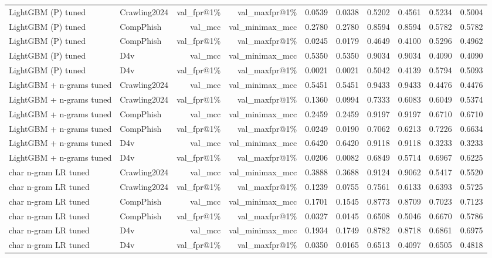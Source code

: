 \begin{table}[t]
\begin{tabular}{llrrrrrrrr}
LightGBM (P) tuned & Crawling2024 & val\_fpr@1\% & val\_maxfpr@1\% & 0.0539 & 0.0338 & 0.5202 & 0.4561 & 0.5234 & 0.5004 \\
LightGBM (P) tuned & CompPhish & val\_mcc & val\_minimax\_mcc & 0.2780 & 0.2780 & 0.8594 & 0.8594 & 0.5782 & 0.5782 \\
LightGBM (P) tuned & CompPhish & val\_fpr@1\% & val\_maxfpr@1\% & 0.0245 & 0.0179 & 0.4649 & 0.4100 & 0.5296 & 0.4962 \\
LightGBM (P) tuned & D4v & val\_mcc & val\_minimax\_mcc & 0.5350 & 0.5350 & 0.9034 & 0.9034 & 0.4090 & 0.4090 \\
LightGBM (P) tuned & D4v & val\_fpr@1\% & val\_maxfpr@1\% & 0.0021 & 0.0021 & 0.5042 & 0.4139 & 0.5794 & 0.5093 \\
LightGBM + n-grams tuned & Crawling2024 & val\_mcc & val\_minimax\_mcc & 0.5451 & 0.5451 & 0.9433 & 0.9433 & 0.4476 & 0.4476 \\
LightGBM + n-grams tuned & Crawling2024 & val\_fpr@1\% & val\_maxfpr@1\% & 0.1360 & 0.0994 & 0.7333 & 0.6083 & 0.6049 & 0.5374 \\
LightGBM + n-grams tuned & CompPhish & val\_mcc & val\_minimax\_mcc & 0.2459 & 0.2459 & 0.9197 & 0.9197 & 0.6710 & 0.6710 \\
LightGBM + n-grams tuned & CompPhish & val\_fpr@1\% & val\_maxfpr@1\% & 0.0249 & 0.0190 & 0.7062 & 0.6213 & 0.7226 & 0.6634 \\
LightGBM + n-grams tuned & D4v & val\_mcc & val\_minimax\_mcc & 0.6420 & 0.6420 & 0.9118 & 0.9118 & 0.3233 & 0.3233 \\
LightGBM + n-grams tuned & D4v & val\_fpr@1\% & val\_maxfpr@1\% & 0.0206 & 0.0082 & 0.6849 & 0.5714 & 0.6967 & 0.6225 \\
char n-gram LR tuned & Crawling2024 & val\_mcc & val\_minimax\_mcc & 0.3888 & 0.3688 & 0.9124 & 0.9062 & 0.5417 & 0.5520 \\
char n-gram LR tuned & Crawling2024 & val\_fpr@1\% & val\_maxfpr@1\% & 0.1239 & 0.0755 & 0.7561 & 0.6133 & 0.6393 & 0.5725 \\
char n-gram LR tuned & CompPhish & val\_mcc & val\_minimax\_mcc & 0.1701 & 0.1545 & 0.8773 & 0.8709 & 0.7023 & 0.7123 \\
char n-gram LR tuned & CompPhish & val\_fpr@1\% & val\_maxfpr@1\% & 0.0327 & 0.0145 & 0.6508 & 0.5046 & 0.6670 & 0.5786 \\
char n-gram LR tuned & D4v & val\_mcc & val\_minimax\_mcc & 0.1934 & 0.1749 & 0.8782 & 0.8718 & 0.6861 & 0.6975 \\
char n-gram LR tuned & D4v & val\_fpr@1\% & val\_maxfpr@1\% & 0.0350 & 0.0165 & 0.6513 & 0.4097 & 0.6505 & 0.4818 \\

\end{tabular}
\end{table}
